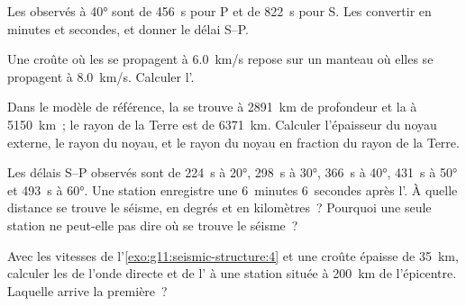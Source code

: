 \begin{exercise}[$\star$]\label{exo:g11:seismic-structure:3}
Les  observés à \ang{40} sont de \qty{456}{s} pour P et de
\qty{822}{s} pour S. Les convertir en minutes et secondes, et donner le
délai S--P.
\end{exercise}

\begin{exercise}[$\star$]\label{exo:g11:seismic-structure:4}
Une croûte où les  se propagent à \qty{6.0}{km/s} repose sur un
manteau où elles se propagent à \qty{8.0}{km/s}. Calculer l'.
\end{exercise}

\begin{exercise}[$\star$]\label{exo:g11:seismic-structure:5}
Dans le modèle de référence, la  se trouve à
\qty{2891}{km} de profondeur et la  à
\qty{5150}{km}~; le rayon de la Terre est de \qty{6371}{km}. Calculer
l'épaisseur du noyau externe, le rayon du noyau, et le rayon du noyau en
fraction du rayon de la Terre.
\end{exercise}

\begin{exercise}[$\star\star$]\label{exo:g11:seismic-structure:6}
Les délais S--P observés sont de \qty{224}{s} à \ang{20}, \qty{298}{s} à
\ang{30}, \qty{366}{s} à \ang{40}, \qty{431}{s} à \ang{50} et
\qty{493}{s} à \ang{60}. Une station enregistre une  6~minutes
6~secondes après l'. À quelle distance se trouve le séisme, en degrés
et en kilomètres~? Pourquoi une seule station ne peut-elle pas dire où se
trouve le séisme~?
\end{exercise}

\begin{exercise}[$\star\star$]\label{exo:g11:seismic-structure:7}
Avec les vitesses de l'\cref{exo:g11:seismic-structure:4} et une croûte
épaisse de \qty{35}{km}, calculer les  de l'onde directe et
de l' à une station située à \qty{200}{km} de l'épicentre.
Laquelle arrive la première~?
\end{exercise}

